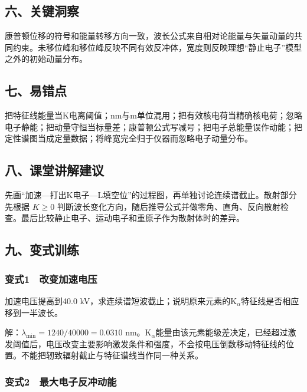 \documentclass[12pt,a4paper,fontset=fandol]{ctexart}
\begin{document}
\subsection{六、关键洞察}\label{ux516dux5173ux952eux6d1eux5bdf-7}

康普顿位移的符号和能量转移方向一致，波长公式来自相对论能量与矢量动量的共同约束。未移位峰和移位峰反映不同有效反冲体，宽度则反映理想``静止电子''模型之外的初始动量分布。

\subsection{七、易错点}\label{ux4e03ux6613ux9519ux70b9-7}

把特征线能量当K电离阈值；nm与m单位混用；把有效核电荷当精确核电荷；忽略电子静能；把动量守恒当标量差；康普顿公式写减号；把电子总能量误作动能；把定性谱图当成定量数据；将峰宽完全归于仪器而忽略电子动量分布。

\subsection{八、课堂讲解建议}\label{ux516bux8bfeux5802ux8bb2ux89e3ux5efaux8bae-7}

先画``加速---打出K电子---L填空位''的过程图，再单独讨论连续谱截止。散射部分先根据
\(K\ge0\)
判断波长变化方向，随后推导公式并做零角、直角、反向散射检查。最后比较静止电子、运动电子和重原子作为散射体时的差异。

\subsection{九、变式训练}\label{ux4e5dux53d8ux5f0fux8badux7ec3-7}

\subsubsection{变式1　改变加速电压}\label{ux53d8ux5f0f1-ux6539ux53d8ux52a0ux901fux7535ux538b}

加速电压提高到40.0
kV，求连续谱短波截止；说明原来元素的K\(_\alpha\)特征线是否相应移到一半波长。

解：\(\lambda_{\min}=1240/40000=0.0310\)
nm。K\(_\alpha\)能量由该元素能级差决定，已经超过激发阈值后，电压改变主要影响激发条件和强度，不会按电压倒数移动特征线的位置。不能把轫致辐射截止与特征谱线当作同一种关系。

\subsubsection{变式2　最大电子反冲动能}\label{ux53d8ux5f0f2-ux6700ux5927ux7535ux5b50ux53cdux51b2ux52a8ux80fd}
\end{document}
